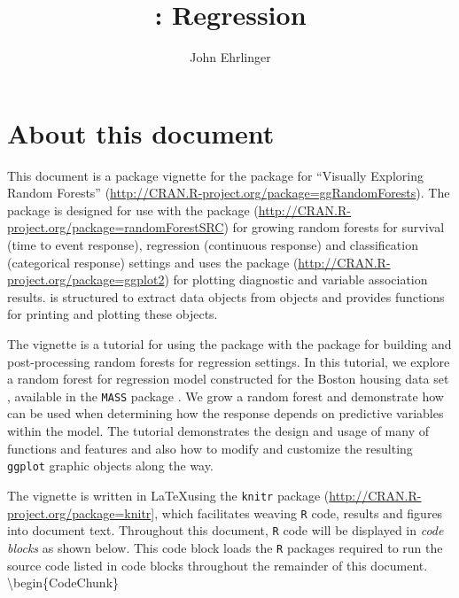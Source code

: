 \documentclass[article]{jss}
\author{
John Ehrlinger\\
}
\title{\pkg{ggRandomForests}: Regression \pkg{randomForestSRC}}
\begin{document}
\hypertarget{about-this-document}{%
\section{About this document}\label{about-this-document}}

This document is a package vignette for the 
package for ``Visually Exploring Random Forests''
(\url{http://CRAN.R-project.org/package=ggRandomForests}). The
 package is designed for use with the
 package
(\url{http://CRAN.R-project.org/package=randomForestSRC})
\citep{Ishwaran:RFSRC:2014} for growing random forests for survival
(time to event response), regression (continuous response) and
classification (categorical response) settings and uses the
 package (\url{http://CRAN.R-project.org/package=ggplot2})
\citep{Wickham:2009} for plotting diagnostic and variable association
results.  is structured to extract data objects
from  objects and provides functions for printing
and plotting these objects.

The vignette is a tutorial for using the  package
with the  package for building and post-processing
random forests for regression settings. In this tutorial, we explore a
random forest for regression model constructed for the Boston housing
data set \citep[\citet{Belsley:1980}]{Harrison:1978}, available in the
\texttt{MASS} package \citep{mass:2002}. We grow a random forest and
demonstrate how  can be used when determining how
the response depends on predictive variables within the model. The
tutorial demonstrates the design and usage of many of
 functions and features and also how to modify and
customize the resulting \texttt{ggplot} graphic objects along the way.

The vignette is written in \LaTeX using the \texttt{knitr} package
(\url{http://CRAN.R-project.org/package=knitr}{]}\citep[\citet{Xie:2014},\citet{Xie:2013}]{Xie:2015},
which facilitates weaving \texttt{R} \citep{rcore} code, results and
figures into document text. Throughout this document, \texttt{R} code
will be displayed in \emph{code blocks} as shown below. This code block
loads the \texttt{R} packages required to run the source code listed in
code blocks throughout the remainder of this document.
\textbackslash{}begin\{CodeChunk\}
\end{document}
